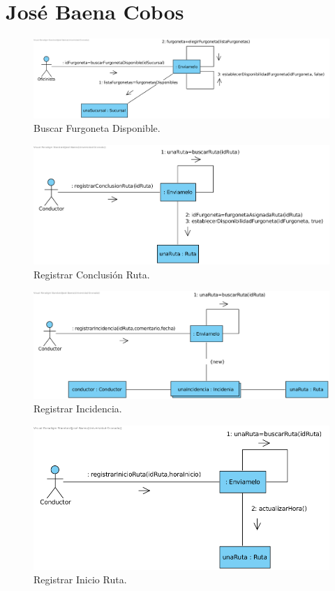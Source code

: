 \documentclass[12pt,spanish]{article}
\begin{document}
\section{José Baena Cobos}

\begin{figure}[H]
\centering
\includegraphics[scale=0.5]{buscarFurgonetaDisponible.png}
\caption{Buscar Furgoneta Disponible.}
\end{figure}

\begin{figure}[H]
\centering
\includegraphics[scale=0.5]{registrarConclusionRuta.png}
\caption{Registrar Conclusión Ruta.}
\end{figure}

\begin{figure}[H]
\centering
\includegraphics[scale=0.5]{registrarIncidencia.png}
\caption{Registrar Incidencia.}
\end{figure}

\begin{figure}[H]
\centering
\includegraphics[scale=0.5]{registrarInicioRuta.png}
\caption{Registrar Inicio Ruta.}
\end{figure}
\end{document}

